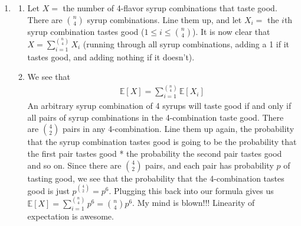 \documentclass[12pt]{article}
\theoremstyle{definition}
\theoremstyle{remark}
\newcommand{\E}{\mathbb{E}}
\begin{document}
\begin{enumerate}[leftmargin=\labelsep]
\begin{enumerate}
			Let $X_i = $ the $i$th left bright striped sock is fashionably mismatched. Clearly $X = \sum_{i=1}^3 X_i$. We wish to find the probability that the right sock assigned to the $i$th bright striped left sock is another bright striped sock not in the same pair. Since there are $3-1=2$ right bright striped socks not in the $i$th pair, and a total of $10$ socks we could assign to be it's right sock, this has a probability of $1/5$ of happening. We see that $\E[X_i] = 1/5$ for all $1 \leq i \leq 3$. Therefore, $\E[x] = 3/5$. Similarly, letting $Y_i = $ the $i$th left checkered design sock is fashionably mismatched ($i \leq 1 \leq 5$). This time, there are $5-1$ right checkered socks not in the $i$th pair, and there are still 10 possible right socks, so $Y_i$ has a probability equal to $4/10 = 2/5$ of happening. Therefore, $\E[Y] = 5 \cdot 2/5 = 2$. The same logic will give us $\E[Z] = 2 \cdot 1/10 = 2/10$. We conclude that $\E[X+Y+Z] = \E[X] + \E[Y] + \E[Z] = 3/5 + 1/5 + 2 = 4/5 + 2$. We have to double this as we discussed above, so we conclude that $\E[\text{number of fashionably mismatched socks}] = 8/5 + 4$.
		\end{enumerate}
		
		\newpage
		\item 
		\begin{enumerate}
			\item Let $X=$ the number of 4-flavor syrup combinations that taste good. There are ${n \choose 4}$ syrup combinations. Line them up, and let $X_i = $ the $i$th syrup combination tastes good ($1 \leq i \leq {n \choose 4}$). It is now clear that $X = \sum_{i=1}^{n \choose 4} X_i$ (running through all syrup combinations, adding a 1 if it tastes good, and adding nothing if it doesn't).
			
			\item
			We see that
			\begin{align*}
				\E[X] = \sum_{i=1}^{n \choose 4} \E[X_i]
			\end{align*}
			An arbitrary syrup combination of 4 syrups will taste good if and only if all pairs of syrup combinations in the 4-combination taste good. There are ${4 \choose 2}$ pairs in any 4-combination. Line them up again, the probability that the syrup combination tastes good is going to be the probability that the first pair tastes good * the probability the second pair tastes good and so on. Since there are ${4 \choose 2}$ pairs, and each pair has probability $p$ of tasting good, we see that the probability that the 4-combination tastes good is just $p^{4 \choose 2} = p^6$. Plugging this back into our formula gives us $\E[X] = \sum_{i=1}^{n \choose 4} p^6 = {n \choose 4}p^6$. My mind is blown!!! Linearity of expectation is awesome.
		\end{enumerate}
		

\end{enumerate}
\end{document}
